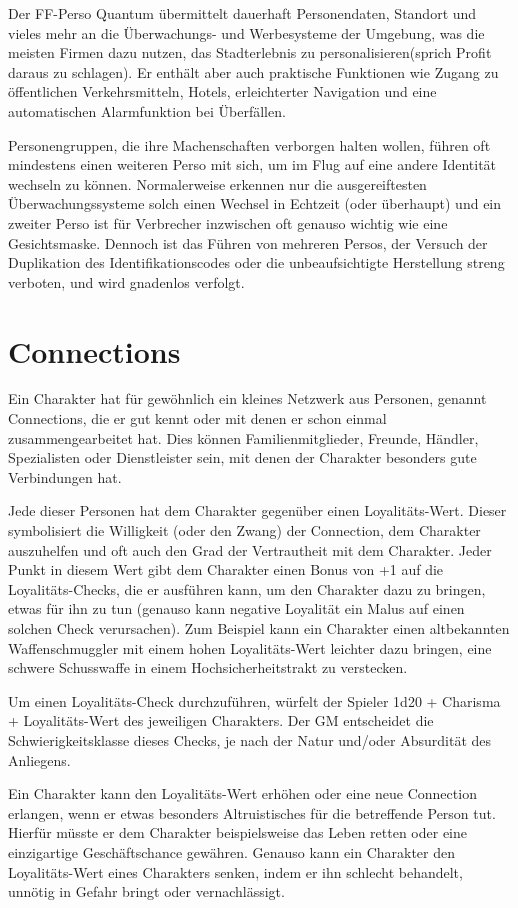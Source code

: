 Der FF-Perso Quantum übermittelt dauerhaft Personendaten, Standort und vieles mehr an die Überwachungs- und Werbesysteme der Umgebung, was die meisten Firmen dazu nutzen, das Stadterlebnis zu \glqq personalisieren\grqq{}(sprich Profit daraus zu schlagen). Er enthält aber auch praktische Funktionen wie Zugang zu öffentlichen Verkehrsmitteln, Hotels, erleichterter Navigation und eine automatischen Alarmfunktion bei Überfällen.

Personengruppen, die ihre Machenschaften verborgen halten wollen, führen oft mindestens einen weiteren Perso mit sich, um im Flug auf eine andere Identität wechseln zu können. Normalerweise erkennen nur die ausgereiftesten Überwachungssysteme solch einen Wechsel in Echtzeit (oder überhaupt) und ein zweiter Perso ist für Verbrecher inzwischen oft genauso wichtig wie eine Gesichtsmaske. Dennoch ist das Führen von mehreren Persos, der Versuch der Duplikation des Identifikationscodes oder die unbeaufsichtigte Herstellung streng verboten, und wird gnadenlos verfolgt.
\section{Connections}
Ein Charakter hat für gewöhnlich ein kleines Netzwerk aus Personen, genannt Connections, die er gut kennt oder mit denen er schon einmal zusammengearbeitet hat. Dies können Familienmitglieder, Freunde, Händler, Spezialisten oder Dienstleister sein, mit denen der Charakter besonders gute Verbindungen hat.

Jede dieser Personen hat dem Charakter gegenüber einen Loyalitäts-Wert. Dieser symbolisiert die Willigkeit (oder den Zwang) der Connection, dem Charakter auszuhelfen und oft auch den Grad der Vertrautheit mit dem Charakter. Jeder Punkt in diesem Wert gibt dem Charakter einen Bonus von +1 auf die Loyalitäts-Checks, die er ausführen kann, um den Charakter dazu zu bringen, etwas für ihn zu tun (genauso kann negative Loyalität ein Malus auf einen solchen Check verursachen). Zum Beispiel kann ein Charakter einen altbekannten Waffenschmuggler mit einem hohen Loyalitäts-Wert leichter dazu bringen, eine schwere Schusswaffe in einem Hochsicherheitstrakt zu verstecken.

Um einen Loyalitäts-Check durchzuführen, würfelt der Spieler 1d20 + Charisma + Loyalitäts-Wert des jeweiligen Charakters. Der GM entscheidet die Schwierigkeitsklasse dieses Checks, je nach der Natur und/oder Absurdität des Anliegens.

Ein Charakter kann den Loyalitäts-Wert erhöhen oder eine neue Connection erlangen, wenn er etwas besonders Altruistisches für die betreffende Person tut. Hierfür müsste er dem Charakter beispielsweise das Leben retten oder eine einzigartige Geschäftschance gewähren.
Genauso kann ein Charakter den Loyalitäts-Wert eines Charakters senken, indem er ihn schlecht behandelt, unnötig in Gefahr bringt oder vernachlässigt.

